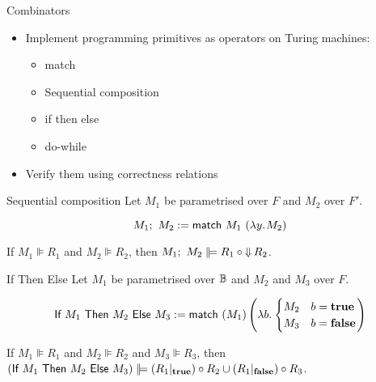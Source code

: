\begin{frame}{Combinators}
  \begin{itemize}
    \item Implement programming primitives as operators on Turing machines:
    \begin{itemize}
      \item match
      \item Sequential composition
      \item if then else
      \item do-while
    \end{itemize}
  \item Verify them using correctness relations
  \end{itemize}
\end{frame}

\begin{frame}{Sequential composition}
  Let $M_1$ be parametrised over $F$ and $M_2$ over $F'$.

  \begin{definition}
    $$M_1 ;~ M_2 := \textsf{match}~M_1~(\lambda y{.}\hskip.7ptM_2)$$
  \end{definition}

  \begin{corollary}
    If $M_1 \VDash R_1$ and $M_2 \VDash R_2$, then $M_1 \mseq M_2 \VDash R_1 \circ \hideParam R_2$.
  \end{corollary}
\end{frame}

\begin{frame}{If Then Else}
  Let $M_1$ be parametrised over $\mathbb{B}$ and $M_2$ and $M_3$ over $F$.

  \begin{definition}[Boolean if]
    $$ \textsf{If}~M_1~\textsf{Then}~M_2~\textsf{Else}~M_3 := \textsf{match}~(M_1) \left(\lambda b{.}\hskip.7pt\begin{cases} M_2 & b = \mathbf{true} \\ M_3 & b = \mathbf{false} \end{cases} \right) $$
  \end{definition}

  \begin{corollary}
    If $M_1 \VDash R_1$ and $M_2 \VDash R_2$ and $M_3 \VDash R_3$, then
    $(\mif{M_1}{M_2}{M_3}) \VDash (R_1 \at \true) \circ R_2 \cup (R_1 \at \false) \circ R_3$.
  \end{corollary}
\end{frame}

